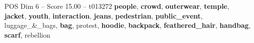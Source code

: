 \begin{textsample}{POS Dim 6 – Score 15.00 – t013272}  \label{ex:f6_pos_026}
\textbf{people}, \textbf{crowd}, \textbf{outerwear}, \textbf{temple}, \textbf{jacket}, \textbf{youth}, \textbf{interaction}, \textbf{jeans}, \textbf{pedestrian}, \textbf{public\_event}, luggage\_\&\_bags, \textbf{bag}, protest, \textbf{hoodie}, \textbf{backpack}, \textbf{feathered\_hair}, \textbf{handbag}, \textbf{scarf}, rebellion

\end{textsample}
